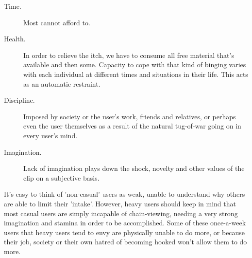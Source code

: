 \documentclass[easypeasy]{subfiles}
\begin{document}
  \begin{description}
  \item [Time.] Most cannot afford to.
  \item [Health.] In order to relieve the itch, we have to consume all free material that's available and then some. Capacity to cope with that kind of binging varies with each individual at different times and situations in their life. This acts as an automatic restraint.
  \item [Discipline.] Imposed by society or the user's work, friends and relatives, or perhaps even the user themselves as a result of the natural tug-of-war going on in every user's mind.
  \item [Imagination.] Lack of imagination plays down the shock, novelty and other values of the clip on a subjective basis.
  \end{description}

It's easy to think of 'non-casual' users as weak, unable to understand why others are able to limit their 'intake'. However, heavy users should keep in mind that most casual users are simply incapable of chain-viewing, needing a very strong imagination and stamina in order to be accomplished. Some of these once-a-week users that heavy users tend to envy are physically unable to do more, or because their job, society or their own hatred of becoming hooked won't allow them to do more.
\end{document}
